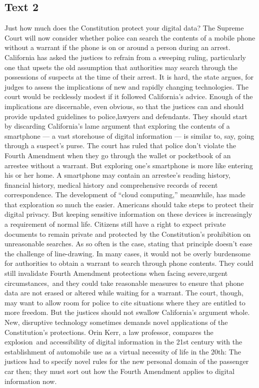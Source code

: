 \subsection{Text 2}
   Just how much does the Constitution protect your digital data? The Supreme Court will now consider whether police can search the contents of a mobile phone without a warrant if the phone is on or around a person during an arrest.
   California has asked the justices to refrain from a sweeping ruling, particularly one that upsets the old assumption that authorities may search through the possessions of suspects at the time of their arrest. It is hard, the state argues, for judges to assess the implications of new and rapidly changing technologies.
   The court would be recklessly modest if it followed California’s advice. Enough of the implications are discernable, even obvious, so that the justices can and should provide updated guidelines to police,lawyers and defendants.
   They should start by discarding California’s lame argument that exploring the contents of a smartphone — a vast storehouse of digital information — is similar to, say, going through a suspect’s purse. The court has ruled that police don’t violate the Fourth Amendment when they go through the wallet or pocketbook of an arrestee without a warrant. But exploring one’s smartphone is more like entering his or her home. A smartphone may contain an arrestee’s reading history, financial history, medical history and comprehensive records of recent correspondence. The development of “cloud computing,” meanwhile, has made that exploration so much the easier.
   Americans should take steps to protect their digital privacy. But keeping sensitive information on these devices is increasingly a requirement of normal life. Citizens still have a right to expect private documents to remain private and protected by the Constitution’s prohibition on unreasonable searches.
   As so often is the case, stating that principle doesn’t ease the challenge of line-drawing. In many cases, it would not be overly burdensome for authorities to obtain a warrant to search through phone contents. They could still invalidate Fourth Amendment protections when facing severe,urgent circumstances, and they could take reasonable measures to ensure that phone data are not erased or altered while waiting for a warrant. The court, though, may want to allow room for police to cite situations where they are entitled to more freedom.
    But the justices should not swallow California’s argument whole. New, disruptive technology sometimes demands novel applications of the Constitution’s protections. Orin Kerr, a law professor, compares the explosion and accessibility of digital information in the 21st century with the establishment of automobile use as a virtual necessity of life in the 20th: The justices had to specify novel rules for the new personal domain of the passenger car then; they must sort out how the Fourth Amendment applies to digital information now.	
